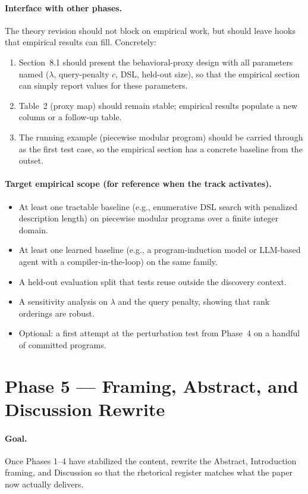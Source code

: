 \documentclass[11pt]{article}
\begin{document}
\paragraph{Interface with other phases.} The theory revision should not block on empirical work, but should leave hooks that empirical results can fill. Concretely:
\begin{enumerate}[leftmargin=*]
\item Section~8.1 should present the behavioral-proxy design with all parameters named ($\lambda$, query-penalty $c$, DSL, held-out size), so that the empirical section can simply report values for these parameters.
\item Table~2 (proxy map) should remain stable; empirical results populate a new column or a follow-up table.
\item The running example (piecewise modular program) should be carried through as the first test case, so the empirical section has a concrete baseline from the outset.
\end{enumerate}

\paragraph{Target empirical scope (for reference when the track activates).}
\begin{itemize}[leftmargin=*]
\item At least one tractable baseline (e.g., enumerative DSL search with penalized description length) on piecewise modular programs over a finite integer domain.
\item At least one learned baseline (e.g., a program-induction model or LLM-based agent with a compiler-in-the-loop) on the same family.
\item A held-out evaluation split that tests reuse outside the discovery context.
\item A sensitivity analysis on $\lambda$ and the query penalty, showing that rank orderings are robust.
\item Optional: a first attempt at the perturbation test from Phase~4 on a handful of committed programs.
\end{itemize}

\section{Phase 5 --- Framing, Abstract, and Discussion Rewrite}
\label{sec:phase5}

\paragraph{Goal.} Once Phases 1--4 have stabilized the content, rewrite the Abstract, Introduction framing, and Discussion so that the rhetorical register matches what the paper now actually delivers.
\end{document}
